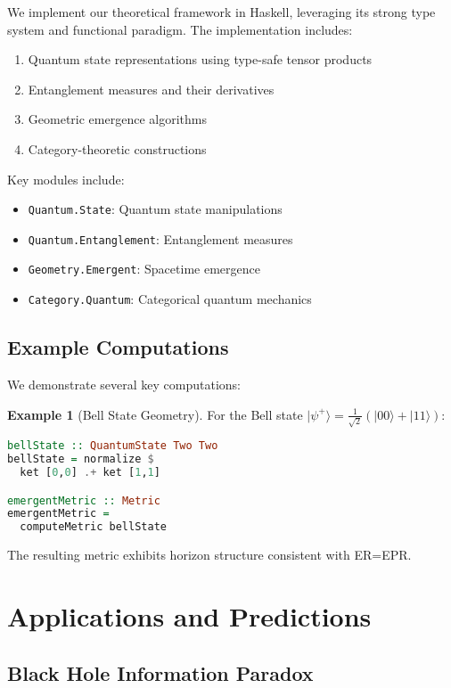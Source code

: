 \documentclass[12pt,a4paper]{article}
\theoremstyle{plain}
\theoremstyle{definition}
\newtheorem{example}[theorem]{Example}
\theoremstyle{remark}
\begin{document}
We implement our theoretical framework in Haskell, leveraging its strong type system and functional paradigm. The implementation includes:

\begin{enumerate}
\item Quantum state representations using type-safe tensor products
\item Entanglement measures and their derivatives
\item Geometric emergence algorithms
\item Category-theoretic constructions
\end{enumerate}

Key modules include:
\begin{itemize}
\item \texttt{Quantum.State}: Quantum state manipulations
\item \texttt{Quantum.Entanglement}: Entanglement measures
\item \texttt{Geometry.Emergent}: Spacetime emergence
\item \texttt{Category.Quantum}: Categorical quantum mechanics
\end{itemize}

\subsection{Example Computations}

We demonstrate several key computations:

\begin{example}[Bell State Geometry]
For the Bell state $|\psi^+\rangle = \frac{1}{\sqrt{2}}(|00\rangle + |11\rangle)$:
\begin{lstlisting}[language=Haskell]
bellState :: QuantumState Two Two
bellState = normalize $ 
  ket [0,0] .+ ket [1,1]

emergentMetric :: Metric
emergentMetric = 
  computeMetric bellState
\end{lstlisting}
The resulting metric exhibits horizon structure consistent with ER=EPR.
\end{example}

\section{Applications and Predictions}

\subsection{Black Hole Information Paradox}
\end{document}

